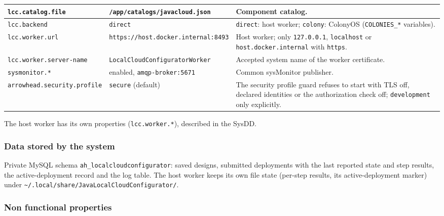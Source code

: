 \documentclass[a4paper]{arrowhead}
\begin{document}
\begin{longtable}{| >{\raggedright\arraybackslash}p{5.0cm} | >{\raggedright\arraybackslash}p{3.8cm} | >{\raggedright\arraybackslash}p{6.0cm} |}
\texttt{lcc.\allowbreak{}catalog.\allowbreak{}file} & \texttt{/\allowbreak{}app/\allowbreak{}catalogs/\allowbreak{}javacloud.\allowbreak{}json} & Component catalog. \\ \hline
\texttt{lcc.\allowbreak{}backend} & \texttt{direct} & \texttt{direct}: host worker; \texttt{colony}: ColonyOS (\texttt{COLONIES\_\allowbreak{}*} variables). \\ \hline
\texttt{lcc.\allowbreak{}worker.\allowbreak{}url} & \texttt{https:\allowbreak{}/\allowbreak{}/\allowbreak{}host.\allowbreak{}docker.\allowbreak{}internal:\allowbreak{}8493} & Host worker; only \texttt{127.0.0.1}, \texttt{localhost} or \texttt{host.\allowbreak{}docker.\allowbreak{}internal} with \texttt{https}. \\ \hline
\texttt{lcc.\allowbreak{}worker.\allowbreak{}server-\allowbreak{}name} & \texttt{LocalCloud\allowbreak{}Configurator\allowbreak{}Worker} & Accepted system name of the worker certificate. \\ \hline
\texttt{sysmonitor.\allowbreak{}*} & enabled, \texttt{amqp-\allowbreak{}broker:\allowbreak{}5671} & Common sysMonitor publisher. \\ \hline
\texttt{arrowhead.\allowbreak{}security.\allowbreak{}profile} & \texttt{secure} (default) & The security profile guard refuses to start with TLS off, declared identities or the authorization check off; \texttt{development} only explicitly. \\ \hline
\end{longtable}

The host worker has its own properties (\texttt{lcc.\allowbreak{}worker.\allowbreak{}*}), described in the SysDD.

\subsubsection{Data stored by the system}

Private MySQL schema \texttt{ah\_\allowbreak{}localcloudconfigurator}: saved designs, submitted deployments with the last reported state and step results, the active-deployment record and the log table. The host worker keeps its own file state (per-step results, its active-deployment marker) under \texttt{\textasciitilde/\allowbreak{}.local/\allowbreak{}share/\allowbreak{}JavaLocalCloudConfigurator/}.

\subsubsection{Non functional properties}
\end{document}
